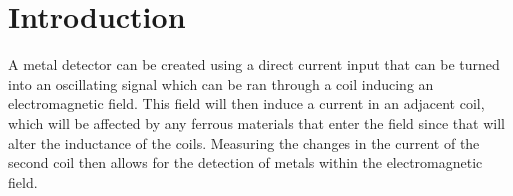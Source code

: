 \section{Introduction}
% 

A metal detector can be created using a direct current input that can be turned into an oscillating signal which can be ran 
through a coil inducing an electromagnetic field. This field will then induce a current in an adjacent coil,
which will be affected by any ferrous materials that enter the field since that will alter the inductance of the coils. Measuring the changes 
in the current of the second coil then allows for the detection of metals within the electromagnetic field. 